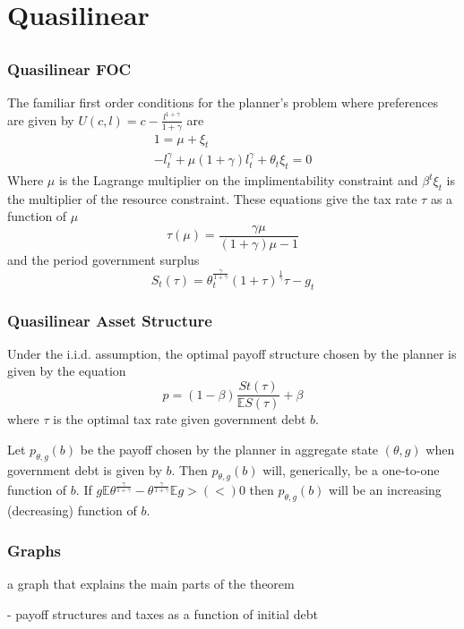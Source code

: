 \documentclass{beamer}
\newcommand{\EE}{\mathbb E}
\begin{document}
\section{Quasilinear}
\subsection{}
 
\begin{frame}
	\frametitle{Quasilinear FOC}
	The familiar first order conditions for the planner's problem where preferences are given by $U(c,l) = c - \frac{l^{1+\gamma}}{1+\gamma}$ are
	\begin{align*}
		1 = \mu +\xi_t\\
		-l_t^\gamma+\mu(1+\gamma)l_t^\gamma+\theta_t\xi_t = 0
	\end{align*}Where $\mu$ is the Lagrange multiplier on the implimentability constraint and $\beta^t\xi_t$ is the multiplier of the resource constraint.   These equations give the tax rate $\tau$ as a function of $\mu$
	\[
		\tau(\mu) = \frac{\gamma\mu}{(1+\gamma)\mu-1}
	\] and the period government surplus 
	\[
		S_t(\tau) = \theta_t^\frac\gamma{1+\gamma}(1+\tau)^\frac1\gamma\tau-g_t
	\]
\end{frame}

\begin{frame}
	\frametitle{Quasilinear Asset Structure}
	Under the i.i.d. assumption, the optimal payoff structure chosen by the planner is given by the equation
	\[
		p = (1-\beta)\frac{St(\tau)}{\EE S(\tau)} + \beta
	\]where $\tau$ is the optimal tax rate given government debt $b$. 
	\begin{lemma}  Let $p_{\theta,g}(b)$ be the payoff chosen by the planner in aggregate state $(\theta,g)$ when government debt is given by $b$.  Then $p_{\theta,g}(b)$ will, generically, be a one-to-one function of $b$.  If $g\EE\theta^\frac{\gamma}{1+\gamma}-\theta^\frac{\gamma}{1+\gamma}\EE g > (<) 0$ then $p_{\theta,g}(b)$ will be an increasing (decreasing) function of $b$. 
	\end{lemma}
\end{frame}

  \begin{frame}
   \frametitle{Graphs }
    a graph that explains the main parts of the theorem
   
   - payoff structures and taxes as a function of initial debt
  \end{frame}

  
  
\end{document}
